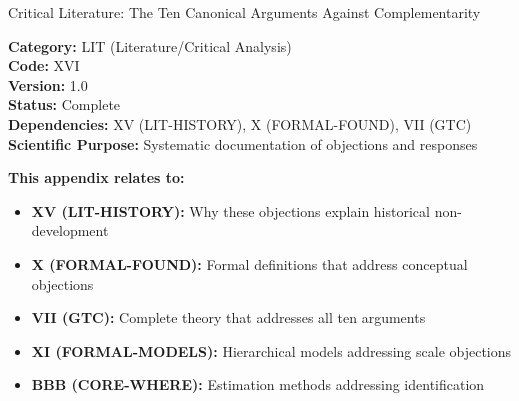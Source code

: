
\begin{chapter}{Critical Literature: The Ten Canonical Arguments Against Complementarity}
\label{app:lit-critique}

\begin{tcolorbox}[colback=gray!5!white,colframe=gray!75!black]
\small
\textbf{Category:} LIT (Literature/Critical Analysis) \\
\textbf{Code:} XVI \\
\textbf{Version:} 1.0 \\
\textbf{Status:} Complete \\
\textbf{Dependencies:} XV (LIT-HISTORY), X (FORMAL-FOUND), VII (GTC) \\
\textbf{Scientific Purpose:} Systematic documentation of objections and responses
\end{tcolorbox}

\begin{tcolorbox}[colback=blue!5!white,colframe=blue!75!black,title=\textbf{Cross-Reference Map}]
\small
\textbf{This appendix relates to:}
\begin{itemize}[noitemsep]
    \item \textbf{XV (LIT-HISTORY):} Why these objections explain historical non-development
    \item \textbf{X (FORMAL-FOUND):} Formal definitions that address conceptual objections
    \item \textbf{VII (GTC):} Complete theory that addresses all ten arguments
    \item \textbf{XI (FORMAL-MODELS):} Hierarchical models addressing scale objections
    \item \textbf{BBB (CORE-WHERE):} Estimation methods addressing identification
\end{itemize}
\end{tcolorbox}


\end{chapter}
